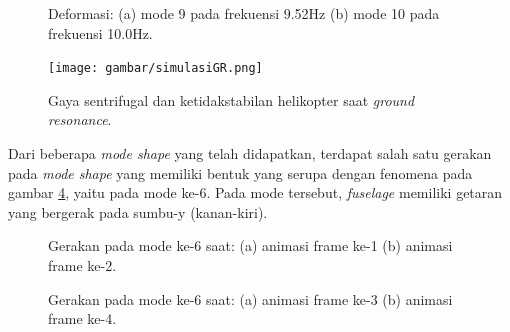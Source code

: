 \begin{figure}[H]
	\begin{subfigure}{0.49\textwidth}
		\centering
		\caption{}
		\label{fig:mode9}
	\end{subfigure}
	\centering
	\begin{subfigure}{0.49\textwidth}
		\centering
		\caption{}
		\label{fig:mode10}
	\end{subfigure}
	\caption{Deformasi: (a) mode 9 pada frekuensi 9.52Hz (b) mode 10 pada frekuensi 10.0Hz.}
\end{figure}

\begin{figure}[H]
	\centering
	\texttt{[image: gambar/simulasiGR.png]}
	\caption{Gaya sentrifugal dan ketidakstabilan helikopter saat \textit{ground resonance}.}
	\label{fig:simulasiGR}
\end{figure}

Dari beberapa \textit{mode shape} yang telah didapatkan, terdapat salah satu gerakan pada \textit{mode shape} yang memiliki bentuk yang serupa dengan fenomena pada gambar \ref{fig:simulasiGR}, yaitu pada mode ke-6. Pada mode tersebut, \textit{fuselage} memiliki getaran yang bergerak pada sumbu-y (kanan-kiri).

\begin{figure}[H]
	\begin{subfigure}{0.49\textwidth}
		\centering
		\caption{}
		\label{fig:mode6_frame_1}
	\end{subfigure}
	\centering
	\begin{subfigure}{0.49\textwidth}
		\centering
		\caption{}
		\label{fig:mode6_frame_2}
	\end{subfigure}
	\caption{Gerakan pada mode ke-6 saat: (a) animasi frame ke-1 (b) animasi frame ke-2.}
\end{figure}

\begin{figure}[H]
	\begin{subfigure}{0.49\textwidth}
		\centering
		\caption{}
		\label{fig:mode6_frame_3}
	\end{subfigure}
	\centering
	\begin{subfigure}{0.49\textwidth}
		\centering
		\caption{}
		\label{fig:mode6_frame_4}
	\end{subfigure}
	\caption{Gerakan pada mode ke-6 saat: (a) animasi frame ke-3 (b) animasi frame ke-4.}
\end{figure}

